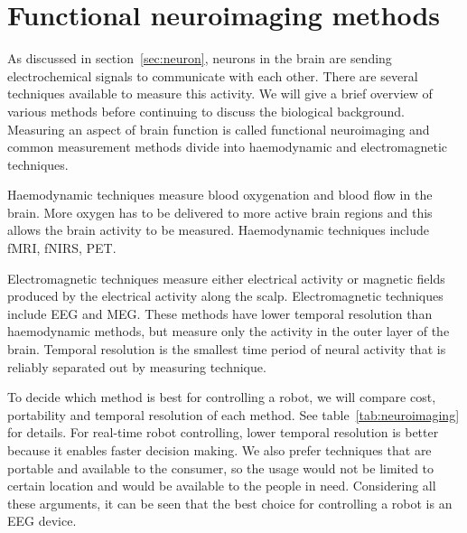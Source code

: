 \section{Functional neuroimaging methods}
\label{sec:neuroimaging}

As discussed in section~\ref{sec:neuron}, neurons in the brain are sending electrochemical signals to communicate with each other. There are several techniques available to measure this activity. We will give a brief overview of various methods before continuing to discuss the biological background. Measuring an aspect of brain function is called functional neuroimaging and common measurement methods divide into haemodynamic and electromagnetic techniques.

Haemodynamic techniques measure blood oxygenation and blood flow in the brain. More oxygen has to be delivered to more active brain regions and this allows the brain activity to be measured. Haemodynamic techniques include \gls{fMRI}, \gls{fNIRS}, \gls{PET}.

Electromagnetic techniques measure either electrical activity or magnetic fields produced by the electrical activity along the scalp. Electromagnetic techniques include \gls{EEG} and \gls{MEG}. These methods have lower temporal resolution than haemodynamic methods, but measure only the activity in the outer layer of the brain. Temporal resolution is the smallest time period of neural activity that is reliably separated out by measuring technique.

To decide which method is best for controlling a robot, we will compare cost, portability and temporal resolution of each method. See table~\ref{tab:neuroimaging} for details. For real-time robot controlling, lower temporal resolution is better because it enables faster decision making. We also prefer techniques that are portable and available to the consumer, so the usage would not be limited to certain location and would be available to the people in need. Considering all these arguments, it can be seen that the best choice for controlling a robot is an \gls{EEG} device.


\newcommand{\pMEG}{\tablefootnote{http://neurogadget.com/2012/12/15/inexpensive-magnetoencephalography-meg-system-could-be-available-at-every-hospital/6495}}
\newcommand{\pfMRI}{\tablefootnote{http://info.blockimaging.com/bid/92623/MRI-Machine-Cost-and-Price-Guide}}
\newcommand{\pPET}{\tablefootnote{http://info.blockimaging.com/bid/68875/How-Much-Does-a-PET-CT-Scanner-Cost}}
\newcommand{\pEEG}{\tablefootnote{http://en.wikipedia.org/wiki/Comparison\_of\_consumer\_brain-computer\_interfaces}}
\newcommand{\pNIRS}{\cite{NIRS}}
\newcommand{\tresol}{\cite{timeresol}}

